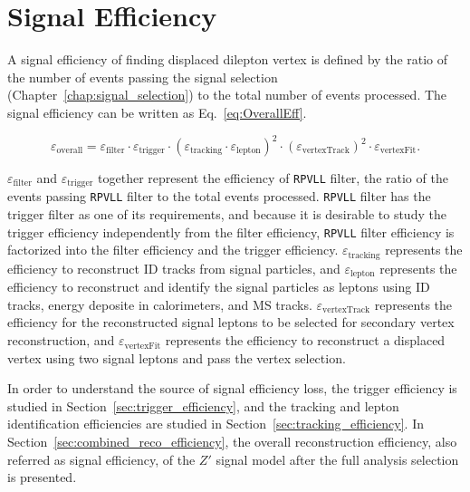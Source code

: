 \chapter{Signal Efficiency}
\label{chap:eff}

A signal efficiency of finding displaced dilepton vertex is defined by the ratio of the number of events passing the signal selection (Chapter~\ref{chap:signal_selection}) to the total number of events processed. The signal efficiency can be written as Eq.~\ref{eq:OverallEff}. 

\begin{equation}
\label{eq:OverallEff}
\varepsilon_{\mathrm{overall}} = \varepsilon_{\mathrm{filter}} \cdot \varepsilon_{\mathrm{trigger}} \cdot 
                     (\varepsilon_{\mathrm{tracking}} \cdot \varepsilon_{\mathrm{lepton}})^2 \cdot
                     (\varepsilon_{\mathrm{vertexTrack}})^2 \cdot
                     \varepsilon_{\mathrm{vertexFit}}.
\end{equation}

$\varepsilon_{\mathrm{filter}}$ and $\varepsilon_{\mathrm{trigger}}$ together represent the efficiency of \texttt{RPVLL} filter, the ratio of the events passing \texttt{RPVLL} filter to the total events processed. \texttt{RPVLL} filter has the trigger filter as one of its requirements, and because it is desirable to study the trigger efficiency independently from the filter efficiency, \texttt{RPVLL} filter efficiency is factorized into the filter efficiency and the trigger efficiency. $\varepsilon_{\mathrm{tracking}}$ represents the efficiency to reconstruct ID tracks from signal particles, and $\varepsilon_{\mathrm{lepton}}$ represents the efficiency to reconstruct and identify the signal particles as leptons using ID tracks, energy deposite in calorimeters, and MS tracks. $\varepsilon_{\mathrm{vertexTrack}}$ represents the efficiency for the reconstructed signal leptons to be selected for secondary vertex reconstruction, and $\varepsilon_{\mathrm{vertexFit}}$ represents the efficiency to reconstruct a displaced vertex using two signal leptons and pass the vertex selection.

In order to understand the source of signal efficiency loss, the trigger efficiency is studied in Section~\ref{sec:trigger_efficiency}, and the tracking and lepton identification efficiencies are studied in Section~\ref{sec:tracking_efficiency}. In Section~\ref{sec:combined_reco_efficiency}, the overall reconstruction efficiency, also referred as signal efficiency, of the $Z'$ signal model after the full analysis selection is presented. 

